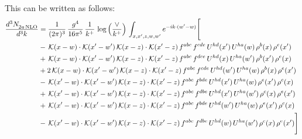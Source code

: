 \documentclass[9pt]{article}
\numberwithin{equation}{section}
\begin{document}
This can be written as follows: 
\begin{align}
\frac{d^{3}N_{2a\,\rm NLO}^{\rm}}{d^{3}k}  & = \frac{1}{(2\pi)^{3}}\,\frac{g^{4}}{16\pi^{5}}\,\frac{1}{k^{+}}\,\log{\left(\frac{\vee}{k^{+}}\right)}\, \int_{x,x',z,w,w'}e^{-ik\cdot(w'-w)}\Bigg[\notag\\
&-\,\mathcal{K}(x-w)\cdot\mathcal{K}(x'-w')\,\mathcal{K}(x-z)\cdot\mathcal{K}(x'-z)\,f^{abc}\,f^{cde}\,U^{hd}(x')\,U^{ha}(w)\,\rho^{b}(x)\,\rho^{e}(x')\notag\\
&+\,\mathcal{K}(x-w)\cdot\mathcal{K}(x'-w')\,\mathcal{K}(x-z)\cdot\mathcal{K}(x'-z)\,f^{abc}\,f^{dce}\,U^{hd}(x)\,U^{ha}(w')\,\rho^{b}(x')\,\rho^{e}(x)\notag\\
&+2\,\mathcal{K}(x-w)\cdot\mathcal{K}(x'-w')\,\mathcal{K}(x-z)\cdot\mathcal{K}(x'-z)\,f^{abc}\,f^{cde}\,U^{hd}(w')\,U^{ha}(w)\,\rho^{b}(x)\,\rho^{e}(x')\notag\\
&-\,\mathcal{K}(x'-w)\cdot\mathcal{K}(x'-w')\,\mathcal{K}(x-z)\cdot\mathcal{K}(x'-z)\,f^{abc}\,f^{bde}\,U^{hd}(x')\,U^{ha}(w)\,\rho^{e}(x')\,\rho^{c}(x)\notag\\
&+\,\mathcal{K}(x'-w)\cdot\mathcal{K}(x'-w')\,\mathcal{K}(x-z)\cdot\mathcal{K}(x'-z)\,f^{abc}\,f^{dbe}\,U^{hd}(x')\,U^{ha}(w')\,\rho^{c}(x)\,\rho^{e}(x')\notag\\
&+\,\mathcal{K}(x'-w)\cdot\mathcal{K}(x'-w')\,\mathcal{K}(x-z)\cdot\mathcal{K}(x'-z)\,f^{abc}\,f^{bde}\,U^{hd}(w')\,U^{ha}(w)\,\rho^{e}(x')\,\rho^{c}(x)\notag\\
&-\,\mathcal{K}(x'-w)\cdot\mathcal{K}(x'-w')\,\mathcal{K}(x-z)\cdot\mathcal{K}(x'-z)\,f^{abc}\,f^{dbe}\,U^{hd}(w)\,U^{ha}(w')\,\rho^{c}(x)\,\rho^{e}(x')\Bigg]
\end{align}
\end{document}
